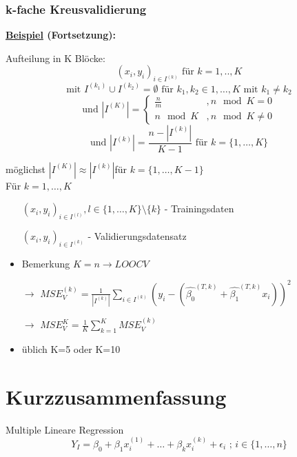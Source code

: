 \subsubsection{k-fache Kreusvalidierung}
\textbf{\underline{Beispiel} (Fortsetzung):}

Aufteilung in K Blöcke:
\[(x_i, y_i)_{i \in I^{(k)}} \text{ für }  k = 1, .., K \] 
\[\text{mit } I^{(k_1)} \cup I^{(k_2)} = \emptyset \text{ für } k_1, k_2 \in {1, \ldots ,K} \text{ mit } k_1 \neq k_2 \]
\[ \text{und } |I^{(K)}| = \begin{cases}
\frac{n}{m} &, n \mod K= 0\\
n \mod K &, n \mod K \neq 0
\end{cases}
\]
\[\text{und } |I^{(k)}| = \frac{n - |I^{(k)}|}{K-1} \text{ für } k = \{1, \ldots ,K\} \]

möglichst \(|I^{(K)}| \approx |I^{(k)}|\)für \(k = \{1, \ldots ,K-1\}\)\\


Für \(k = 1, \ldots, K\) 
\begin{itemize}
	\item[] \((x_i, y_i)_{ i \in I^{(l)}}, l \in \{1, \ldots, K\}\setminus \{k\}\) - Trainingsdaten
	\item[] \((x_i, y_i)_{ i \in I^{(k)}} \) - Validierungsdatensatz
	\item Bemerkung \(K=n \rightarrow LOOCV\) 	
	\item[\(\rightarrow\)]\(MSE_V^{(k)} = \frac{1}{|I^{(k)}|} \sum_{i \in I^{(k)}} ( y_i -( \hat{\beta_0}^{(T,k)} + \hat{\beta_1}^{(T,k)}  x_i))^2\) 
	\item [\(\rightarrow\)]
	\(MSE_V^K = \frac{1}{K} \sum_{k=1}^{K} MSE_V^{(k)}\) 
	\item üblich K=5 oder K=10
\end{itemize}

\section{Kurzzusammenfassung}
Multiple Lineare Regression
\[Y_I = \beta_0 + \beta_1 x_i^{(1)} + \ldots + \beta_k x_i^{(k)} + \epsilon_i \text{ ; } i \in \{1, \ldots,n\}\]


